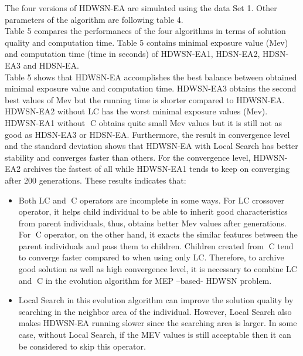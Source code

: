 \documentclass[final]{elsarticle}
\begin{document}
The four versions of HDWSN-EA are simulated using the data Set 1. Other parameters of the algorithm are following table 4.\\
Table 5 compares the performances of the four algorithms in terms of solution quality and computation time. Table 5 contains minimal exposure value (Mev) and computation time (time in seconds) of HDWSN-EA1, HDSN-EA2, HDSN-EA3 and HDSN-EA.\\
Table 5 shows that HDWSN-EA accomplishes the best balance between obtained minimal exposure value and computation time. HDWSN-EA3 obtains the second best values of Mev but the running time is shorter compared to HDWSN-EA. HDWSN-EA2 without LC has the worst minimal exposure values (Mev). HDWSN-EA1 without C obtains quite small Mev values but it is still not as good as HDSN-EA3 or HDSN-EA. Furthermore, the result in convergence level and the standard deviation shows that HDWSN-EA with Local Search has better stability and converges faster than others. For the convergence level, HDWSN-EA2 archives the fastest of all while HDWSN-EA1 tends to keep on converging after 200 generations. These results indicates that:
\begin{itemize}
	\item Both LC and C operators are incomplete in some ways. For LC crossover operator, it helps child individual to be able to inherit good characteristics from parent individuals, thus, obtains better Mev values after generations. For C operator, on the other hand, it exacts the similar features between the parent individuals and pass them to children. Children created from C tend to converge faster compared to when using only LC. Therefore, to archive good solution as well as high convergence level, it is necessary to combine LC and C in the evolution algorithm for MEP –based- HDWSN problem.
	\item Local Search in this evolution algorithm can improve the solution quality by searching in the neighbor area of the individual. However, Local Search also makes HDWSN-EA running slower since the searching area is larger. In some case, without Local Search, if the MEV values is still acceptable then it can be considered to skip this operator.	
\end{itemize}
\end{document}
